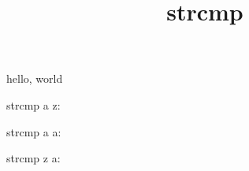 \documentclass{amsart}
\title{strcmp}
\begin{document}
\maketitle

hello, world

strcmp a z: 

strcmp a a: 

strcmp z a: 
\end{document}
